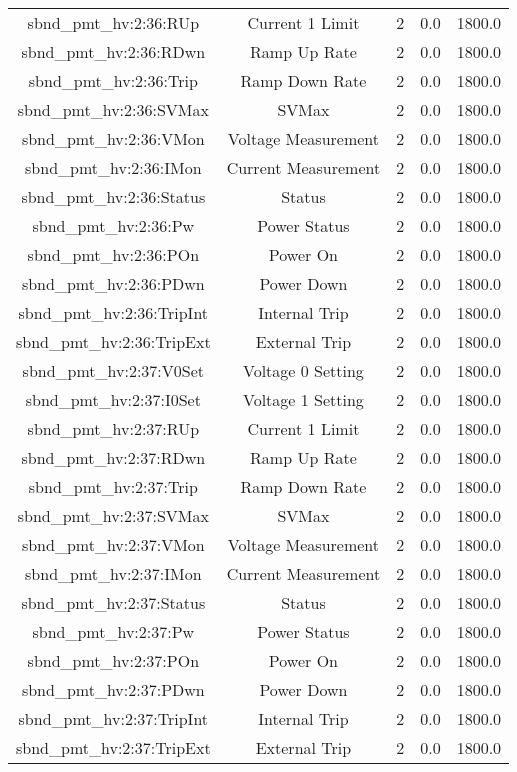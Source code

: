 \begin{center}
\begin{longtable}{c | c c c c }
sbnd\_pmt\_hv:2:36:RUp & Current 1 Limit & 2 & 0.0 & 1800.0\\ 
sbnd\_pmt\_hv:2:36:RDwn & Ramp Up Rate & 2 & 0.0 & 1800.0\\ 
sbnd\_pmt\_hv:2:36:Trip & Ramp Down Rate & 2 & 0.0 & 1800.0\\ 
sbnd\_pmt\_hv:2:36:SVMax & SVMax & 2 & 0.0 & 1800.0\\ 
sbnd\_pmt\_hv:2:36:VMon & Voltage Measurement & 2 & 0.0 & 1800.0\\ 
sbnd\_pmt\_hv:2:36:IMon & Current Measurement & 2 & 0.0 & 1800.0\\ 
sbnd\_pmt\_hv:2:36:Status & Status & 2 & 0.0 & 1800.0\\ 
sbnd\_pmt\_hv:2:36:Pw & Power Status & 2 & 0.0 & 1800.0\\ 
sbnd\_pmt\_hv:2:36:POn & Power On & 2 & 0.0 & 1800.0\\ 
sbnd\_pmt\_hv:2:36:PDwn & Power Down & 2 & 0.0 & 1800.0\\ 
sbnd\_pmt\_hv:2:36:TripInt & Internal Trip & 2 & 0.0 & 1800.0\\ 
sbnd\_pmt\_hv:2:36:TripExt & External Trip & 2 & 0.0 & 1800.0\\ 
sbnd\_pmt\_hv:2:37:V0Set & Voltage 0 Setting & 2 & 0.0 & 1800.0\\ 
sbnd\_pmt\_hv:2:37:I0Set & Voltage 1 Setting & 2 & 0.0 & 1800.0\\ 
sbnd\_pmt\_hv:2:37:RUp & Current 1 Limit & 2 & 0.0 & 1800.0\\ 
sbnd\_pmt\_hv:2:37:RDwn & Ramp Up Rate & 2 & 0.0 & 1800.0\\ 
sbnd\_pmt\_hv:2:37:Trip & Ramp Down Rate & 2 & 0.0 & 1800.0\\ 
sbnd\_pmt\_hv:2:37:SVMax & SVMax & 2 & 0.0 & 1800.0\\ 
sbnd\_pmt\_hv:2:37:VMon & Voltage Measurement & 2 & 0.0 & 1800.0\\ 
sbnd\_pmt\_hv:2:37:IMon & Current Measurement & 2 & 0.0 & 1800.0\\ 
sbnd\_pmt\_hv:2:37:Status & Status & 2 & 0.0 & 1800.0\\ 
sbnd\_pmt\_hv:2:37:Pw & Power Status & 2 & 0.0 & 1800.0\\ 
sbnd\_pmt\_hv:2:37:POn & Power On & 2 & 0.0 & 1800.0\\ 
sbnd\_pmt\_hv:2:37:PDwn & Power Down & 2 & 0.0 & 1800.0\\ 
sbnd\_pmt\_hv:2:37:TripInt & Internal Trip & 2 & 0.0 & 1800.0\\ 
sbnd\_pmt\_hv:2:37:TripExt & External Trip & 2 & 0.0 & 1800.0\\ 

\end{longtable}
\end{center}
